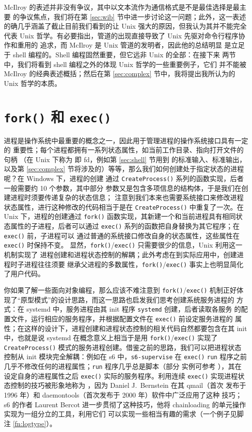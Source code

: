 McIlroy 的表述并非没有争议，其中以文本流作为通信格式是不是最佳选择是最主要
的争议焦点，我们将在第 \ref{sec:wib} 节中进一步讨论这一问题；此外，这一表述
的确几乎涵盖了截止目前我们看到的让 Unix 强大的原因，但我认为其并不能完全代表
Unix 哲学。有必要指出，管道的出现直接导致了 Unix 先驱对命令行程序协作和重用的
追求，而 McIlroy 是 Unix 管道的发明者，因此他的总结明显
是立足于 shell 编程的。Shell 编程固然重要，但它远非 Unix 的全部：在接下来
两节中，我们将看到 shell 编程之外的体现 Unix 哲学的一些重要例子，它们
并不能被 McIlroy 的经典表述概括；然后在第 \ref{sec:complex}
节中，我将提出我所认为的 Unix 哲学的本质。

\section{\texttt{fork()} 和 \texttt{exec()}}\label{sec:exec}

进程是操作系统中最重要的概念之一，因此用于管理进程的操作系统接口具有一定的
重要性；每个进程都拥有一系列状态属性，如当前工作目录、指向打开文件的句柄
（在 Unix 下称为 即 fd，例如第 \ref{sec:shell} 节用到
的标准输入、标准输出，以及第 \ref{sec:complex} 节将涉及的）等等，那么我们如何创建处于指定状态的进程呢？在 Windows 下，进程的创建
通过 \verb|CreateProcess()| 系列的函数实现，后者一般需要约 10 个参数，其中部分
参数又是包含多项信息的结构体，于是我们在创建进程时须要传递复杂的状态信息；
注意到我们本来也需要系统接口来修改进程状态属性，进行这种修改的代码相当于是在
\verb|CreateProcess()| 中重复了一次。在 Unix 下，进程的创建通过 \verb|fork()|
函数实现，其新建一个和当前进程具有相同状态属性的子进程，后者可以通过
\verb|exec()| 系列的函数把自身替换为其它程序；在 \verb|exec()| 前，子进程可以
通过普通的系统接口修改自身的状态属性，这些属性在 \verb|exec()| 时保持不变。
显然，\verb|fork()|/\verb|exec()| 只需要很少的信息，Unix 利用这一机制实现了
进程创建和进程状态控制的解耦；此外考虑在到实际应用中，创建进程时子进程往往须要
继承父进程的多数属性，\verb|fork()|/\verb|exec()| 事实上也明显简化了用户代码。

你如果了解一些面向对象编程，那么应该不难注意到 \verb|fork()|/\verb|exec()|
机制正好体现了“原型模式”的设计思路，而这一思路也启发我们思考创建系统服务进程的
方式：在 systemd 中，服务进程由其 init 程序 \verb|systemd| 创建，后者读取各服务
的配置文件，运行相应的服务程序，并根据配置文件在 \verb|exec()| 前设定服务进程的
属性；在这样的设计下，进程创建和进程状态控制的相关代码自然都要包含在其 init
中，也就是说 systemd 在概念意义上相当于是用 \verb|fork()|/\verb|exec()| 实现了
\verb|CreateProcess()| 模式的服务进程创建。借鉴之前的思路，我们可以把进程状态
控制从 init 模块完全解耦：例如在 s6 中，\verb|s6-supervise| 在 \verb|exec()|
\verb|run| 程序之前几乎不修改任何的进程属性；\verb|run| 程序几乎总是脚本（部分
实例可参考 \parencite{pollard2014}），其在设定自身的进程属性之后 \verb|exec()|
实际的服务程序。利用连续 \verb|exec()| 实现进程状态控制的技巧被形象地称为
，因为 Daniel J.\ Bernstein 在其 qmail（首次
发布于 1996 年）和 daemontools（首次发布于 2000 年）软件中广泛应用了这种
技巧；s6 的作者 Laurent Bercot 进一步贯彻了这种技巧，他将 chainloading
的单元操作实现为一组分立的工具，利用它们
可以实现一些相当有趣的需求（一个例子见脚注 \ref{fn:logtype}）。

